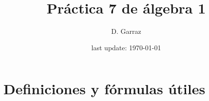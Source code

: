\documentclass[12pt,a4paper, spanish]{article}
\begin{document}

\pagestyle{empty} %

\title{Práctica 7 de álgebra 1} %
\author{D. Garraz} %
\date{last update: \today} %

\maketitle  %

\newcommand{\polGen}[1]{\sumatoria{i=0}{n} #1_i X^i}

\section{Definiciones y fórmulas útiles}
\end{document}
